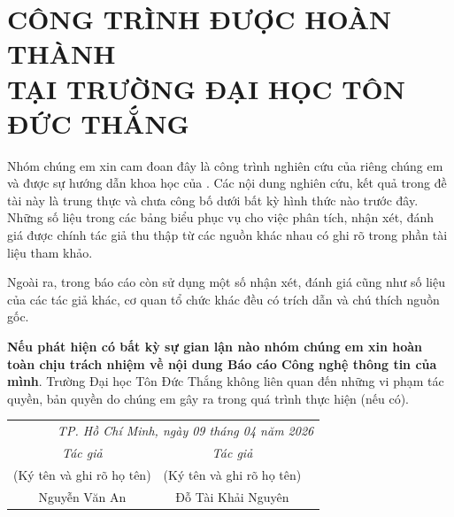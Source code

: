 \section*{ CÔNG TRÌNH ĐƯỢC HOÀN THÀNH\\TẠI TRƯỜNG ĐẠI HỌC TÔN ĐỨC THẮNG}

	Nhóm chúng em xin cam đoan đây là công trình nghiên cứu của riêng chúng em và được sự hướng dẫn khoa học của \textbf{\gvhd}. Các nội dung nghiên cứu, kết quả trong đề tài này là trung thực và chưa công bố dưới bất kỳ hình thức nào trước đây. Những số liệu trong các bảng biểu phục vụ cho việc phân tích, nhận xét, đánh giá được chính tác giả thu thập từ các nguồn khác nhau có ghi rõ trong phần tài liệu tham khảo.
 
	Ngoài ra, trong báo cáo còn sử dụng một số nhận xét, đánh giá cũng như số liệu của các tác giả khác, cơ quan tổ chức khác đều có trích dẫn và chú thích nguồn gốc.
 
	\textbf{Nếu phát hiện có bất kỳ sự gian lận nào nhóm chúng em xin hoàn toàn chịu trách nhiệm về nội dung Báo cáo Công nghệ thông tin của mình}. Trường Đại học Tôn Đức Thắng không liên quan đến những vi phạm tác quyền, bản quyền do chúng em gây ra trong quá trình thực hiện (nếu có).
    
\begin{flushright}
    \begin{tabular}{ccc}
        \multicolumn{3}{r}{\textit{TP. Hồ Chí Minh, ngày 09 tháng 04 năm 2026}} \\
        \noalign{\vspace{0.5cm}} %
         \textit{Tác giả} & \textit{Tác giả} \\
        (Ký tên và ghi rõ họ tên) & (Ký tên và ghi rõ họ tên) \\
        \noalign{\vspace{2cm}}
        Nguyễn Văn An & Đỗ Tài Khải Nguyên  \\
    \end{tabular}
    \end{flushright}
\newpage
